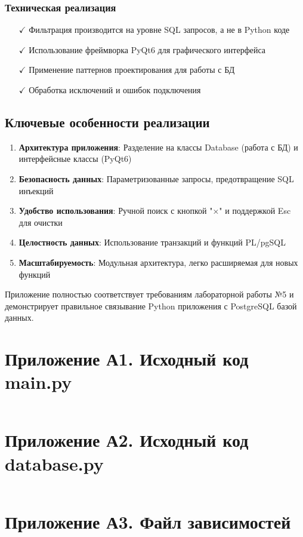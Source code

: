 \documentclass[oneside,a4paper,14pt]{extarticle}
\begin{document}
\subsubsection*{Техническая реализация}
\begin{itemize}
  \item[$\checkmark$] Фильтрация производится на уровне SQL запросов, а не в Python коде
  \item[$\checkmark$] Использование фреймворка PyQt6 для графического интерфейса
  \item[$\checkmark$] Применение паттернов проектирования для работы с БД
  \item[$\checkmark$] Обработка исключений и ошибок подключения
\end{itemize}

\subsection*{Ключевые особенности реализации}

\begin{enumerate}
  \item \textbf{Архитектура приложения}: Разделение на классы Database (работа с БД) и интерфейсные классы (PyQt6)
  \item \textbf{Безопасность данных}: Параметризованные запросы, предотвращение SQL инъекций
  \item \textbf{Удобство использования}: Ручной поиск с кнопкой "×" и поддержкой Esc для очистки
  \item \textbf{Целостность данных}: Использование транзакций и функций PL/pgSQL
  \item \textbf{Масштабируемость}: Модульная архитектура, легко расширяемая для новых функций
\end{enumerate}

Приложение полностью соответствует требованиям лабораторной работы №5 и демонстрирует правильное связывание Python приложения с PostgreSQL базой данных.

\newpage

\section*{Приложение А1. Исходный код main.py}
\inputminted{python}{code/main.py}

\section*{Приложение А2. Исходный код database.py}
\inputminted{python}{code/database.py}

\section*{Приложение А3. Файл зависимостей}
\inputminted{text}{code/requirements.txt}
\end{document}
